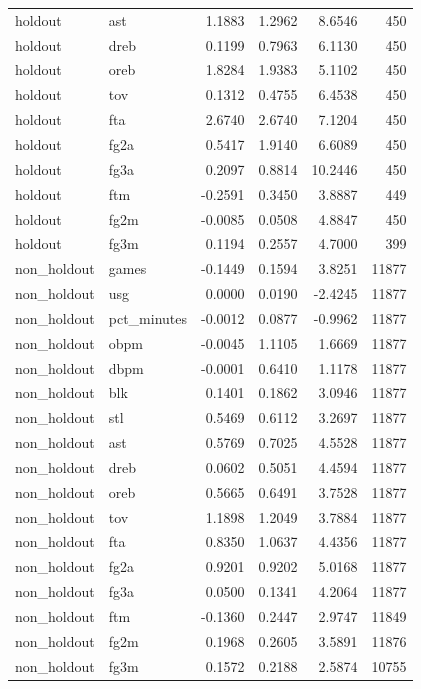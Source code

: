 \begin{table}
\begin{tabular}{llrrrr}
holdout & ast & 1.1883 & 1.2962 & 8.6546 & 450 \\
holdout & dreb & 0.1199 & 0.7963 & 6.1130 & 450 \\
holdout & oreb & 1.8284 & 1.9383 & 5.1102 & 450 \\
holdout & tov & 0.1312 & 0.4755 & 6.4538 & 450 \\
holdout & fta & 2.6740 & 2.6740 & 7.1204 & 450 \\
holdout & fg2a & 0.5417 & 1.9140 & 6.6089 & 450 \\
holdout & fg3a & 0.2097 & 0.8814 & 10.2446 & 450 \\
holdout & ftm & -0.2591 & 0.3450 & 3.8887 & 449 \\
holdout & fg2m & -0.0085 & 0.0508 & 4.8847 & 450 \\
holdout & fg3m & 0.1194 & 0.2557 & 4.7000 & 399 \\
non\_holdout & games & -0.1449 & 0.1594 & 3.8251 & 11877 \\
non\_holdout & usg & 0.0000 & 0.0190 & -2.4245 & 11877 \\
non\_holdout & pct\_minutes & -0.0012 & 0.0877 & -0.9962 & 11877 \\
non\_holdout & obpm & -0.0045 & 1.1105 & 1.6669 & 11877 \\
non\_holdout & dbpm & -0.0001 & 0.6410 & 1.1178 & 11877 \\
non\_holdout & blk & 0.1401 & 0.1862 & 3.0946 & 11877 \\
non\_holdout & stl & 0.5469 & 0.6112 & 3.2697 & 11877 \\
non\_holdout & ast & 0.5769 & 0.7025 & 4.5528 & 11877 \\
non\_holdout & dreb & 0.0602 & 0.5051 & 4.4594 & 11877 \\
non\_holdout & oreb & 0.5665 & 0.6491 & 3.7528 & 11877 \\
non\_holdout & tov & 1.1898 & 1.2049 & 3.7884 & 11877 \\
non\_holdout & fta & 0.8350 & 1.0637 & 4.4356 & 11877 \\
non\_holdout & fg2a & 0.9201 & 0.9202 & 5.0168 & 11877 \\
non\_holdout & fg3a & 0.0500 & 0.1341 & 4.2064 & 11877 \\
non\_holdout & ftm & -0.1360 & 0.2447 & 2.9747 & 11849 \\
non\_holdout & fg2m & 0.1968 & 0.2605 & 3.5891 & 11876 \\
non\_holdout & fg3m & 0.1572 & 0.2188 & 2.5874 & 10755 \\
\bottomrule
\end{tabular}
\end{table}
